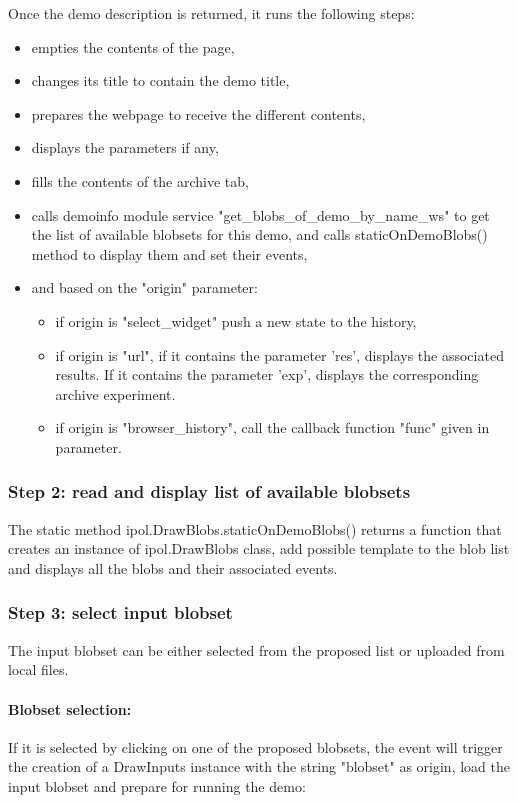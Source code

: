 Once the demo description is returned, it runs the following steps:
\begin{itemize}
  \item empties the contents of the page,
  \item changes its title to contain the demo title,
  \item prepares the webpage to receive the different contents,
  \item displays the parameters if any,
  \item fills the contents of the archive tab,
  \item calls demoinfo module service "get\_blobs\-\_of\-\_demo\-\_by\-\_name\-\_ws"
to get the list of available blobsets for this demo, and calls staticOnDemoBlobs()
method to display them and set their events,
  \item and based on the "origin" parameter:
    \begin{itemize}
      \item if origin is "select\_widget" push a new state to the history,
      \item if origin is "url", if it contains the parameter 'res', displays
            the associated results. If it contains the parameter 'exp', displays
            the corresponding archive experiment.
      \item if origin is "browser\_history", call the callback function "func" 
            given in parameter.
    \end{itemize}
\end{itemize}

\subsubsection{Step 2: read and display list of available blobsets}

The static method ipol.DrawBlobs.staticOnDemoBlobs() returns a function
that creates an instance of ipol.DrawBlobs class, add possible template
to the blob list and displays all the blobs and their associated events.

\subsubsection{Step 3: select input blobset}

The input blobset can be either selected from the proposed list or uploaded from 
local files.
\paragraph{Blobset selection:}
If it is selected by clicking on one of the proposed blobsets, the event will
trigger the creation of a DrawInputs instance with the string "blobset" as origin,
load the input blobset and prepare for running the demo:


